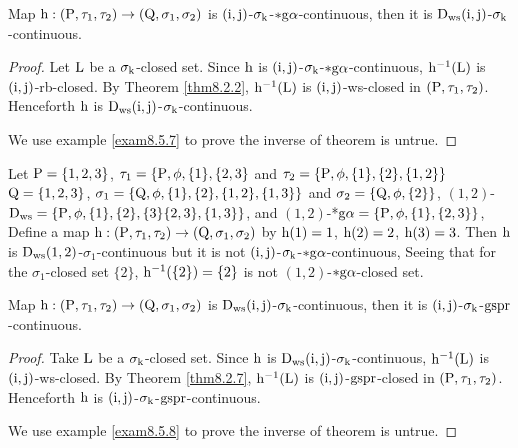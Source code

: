 \begin{thm}\label{thm8.5.7}
Map $\mathrm{h}:(\mathrm{P}, \tau_1, \tau_2 )\to (\mathrm{Q}, \sigma_{1}, \sigma_{2} )$ is $(\mathrm{i}, \mathrm{j})$-$\sigma_{\mathrm{k}}$-$*\mathrm{g}\alpha$-continuous, then it is $\mathrm{D}_{\mathrm{ws}}(\mathrm{i}, \mathrm{j})$-$\sigma_{\mathrm{k}}$-continuous.
\end{thm}

\begin{proof}
Let $\mathrm{L}$ be a $\sigma_{\mathrm{k}}$-closed set. Since $\mathrm{h}$ is $(\mathrm{i}, \mathrm{j})$-$\sigma_{\mathrm{k}}$-$*\mathrm{g}\alpha$-continuous, $\mathrm{h}^{-1} (\mathrm{L})$ is $(\mathrm{i}, \mathrm{j})$-rb-closed. By Theorem \ref{thm8.2.2}, $\mathrm{h}^{-1}(\mathrm{L})$ is $(\mathrm{i}, \mathrm{j})$-ws-closed in $(\mathrm{P}, \tau_1, \tau_2 )$. Henceforth $\mathrm{h}$ is $\mathrm{D}_{\mathrm{ws}} (\mathrm{i}, \mathrm{j})$-$\sigma_{\mathrm{k}}$-continuous.

We use example \ref{exam8.5.7} to prove the inverse of theorem is untrue.
\end{proof}

\begin{exm}\label{exam8.5.7}
Let $\mathrm{P}=\{1,2,3\}$, $\tau_1 =\{\mathrm{P}, \phi, \{1\},\{2,3\}$ and $\tau_2 =\{\TSP, \phi, \{1\},\{2\},\break \{1,2\}\}$ $\mathrm{Q}=\{1,2,3\}$, $\sigma_{1} =\{\mathrm{Q},\phi,\{1\},\{2\},\{1,2\},\{1,3\}\}$ and $\sigma_{2} =\{\mathrm{Q},\phi, \{2\}\}$, $(1,2)$-$\mathrm{D}_{\mathrm{ws}} =\{\mathrm{P}, \phi, \{1\},\{2\},\{3\}\{2,3\},\{1,3\}\}$, and $(1,2)$-*$\mathrm{g}\alpha =\{\mathrm{P}, \phi, \{1\},\{2,3\}\}$, Define a map $\mathrm{h}: (\mathrm{P}, \tau_1, \tau_2 )\to (\mathrm{Q}, \sigma_{1}, \sigma_{2} )$ by $\mathrm{h}(1)=1$, $\mathrm{h}(2)=2$, $\mathrm{h}(3)=3$. Then $\mathrm{h}$ is $\mathrm{D}_{\mathrm{ws}} (1, 2)$-$\sigma_{1}$-continuous but it is not $(\mathrm{i}, \mathrm{j})$-$\sigma_{\mathrm{k}}$-$*\mathrm{g}\alpha$-continuous, Seeing that for the $\sigma_{1}$-closed set $\{2\}$, $\mathrm{h}^{-1} (\{2\})=\{2\}$ is not $(1, 2)$-$*\mathrm{g}\alpha$-closed set.
\end{exm}

\begin{thm}\label{thm8.5.8}
Map $\mathrm{h}:(\mathrm{P}, \tau_1, \tau_2 )\to (\mathrm{Q}, \sigma_{1}, \sigma_{2} )$ is $\mathrm{D}_{\mathrm{ws}} (\mathrm{i}, \mathrm{j})$-$\sigma_{\mathrm{k}}$-continuous, then it is $(\mathrm{i}, \mathrm{j})$-$\sigma_{\mathrm{k}}$-$\mathrm{gspr}$-continuous.
\end{thm}

\begin{proof}
Take $\mathrm{L}$ be a $\sigma_{\mathrm{k}}$-closed set. Since $\mathrm{h}$ is $\mathrm{D}_{\mathrm{ws}}(\mathrm{i}, \mathrm{j})$-$\sigma_{\mathrm{k}}$-continuous, $\mathrm{h}^{-1}(\mathrm{L})$ is $(\mathrm{i}, \mathrm{j})$-ws-closed. By Theorem \ref{thm8.2.7}, $\mathrm{h}^{-1} (\mathrm{L})$ is $(\mathrm{i}, \mathrm{j})$-$\mathrm{gspr}$-closed in $(\mathrm{P}, \tau_1, \tau_2 )$. Henceforth $\mathrm{h}$ is $(\mathrm{i}, \mathrm{j})$-$\sigma_{\mathrm{k}}$-$\mathrm{gspr}$-continuous.

We use example \ref{exam8.5.8} to prove the inverse of theorem is untrue.
\end{proof}

